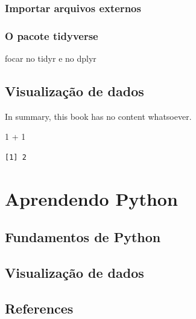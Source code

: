 \documentclass[
  letterpaper,
  DIV=11,
  numbers=noendperiod]{scrreprt}
\newenvironment{Shaded}{\begin{snugshade}}{\end{snugshade}}
\newcommand{\DecValTok}[1]{\textcolor[rgb]{0.68,0.00,0.00}{#1}}
\newcommand{\SpecialCharTok}[1]{\textcolor[rgb]{0.37,0.37,0.37}{#1}}
\newlength{\cslhangindent}
\newlength{\cslentryspacingunit} %
\newenvironment{CSLReferences}[2] %
 {%
  \setlength{\parindent}{0pt}
  \ifodd #1
  \let\oldpar\par
  \def\par{\hangindent=\cslhangindent\oldpar}
  \fi
  \setlength{\parskip}{#2\cslentryspacingunit}
 }%
 {}
\begin{document}
\hypertarget{importar-arquivos-externos}{%
\section{Importar arquivos externos}\label{importar-arquivos-externos}}

\hypertarget{o-pacote-tidyverse}{%
\section{O pacote tidyverse}\label{o-pacote-tidyverse}}

focar no tidyr e no dplyr

\hypertarget{visualizauxe7uxe3o-de-dados}{%
\chapter{Visualização de dados}\label{visualizauxe7uxe3o-de-dados}}

In summary, this book has no content whatsoever.

\begin{Shaded}
\begin{Highlighting}[]
\DecValTok{1} \SpecialCharTok{+} \DecValTok{1}
\end{Highlighting}
\end{Shaded}

\begin{verbatim}
[1] 2
\end{verbatim}

\part{Aprendendo Python}

\hypertarget{fundamentos-de-python}{%
\chapter{Fundamentos de Python}\label{fundamentos-de-python}}

\hypertarget{visualizauxe7uxe3o-de-dados-1}{%
\chapter{Visualização de dados}\label{visualizauxe7uxe3o-de-dados-1}}


\hypertarget{references}{%
\chapter*{References}\label{references}}


\hypertarget{refs}{}
\begin{CSLReferences}{0}{0}
\end{CSLReferences}
\end{document}
